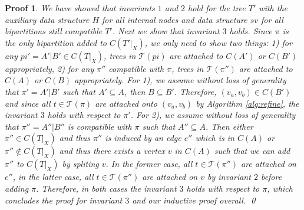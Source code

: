\documentclass{bmcart}
\theoremstyle{mystyle}
\theoremstyle{proofstyle}
\newtheorem*{proof2}{Proof}
\newenvironment{proofnospace}{\begin{proof2}}{\qed \end{proof2}}
\begin{document}
\begin{proofnospace}
    We have showed that invariants $1$ and $2$ hold for the tree $T'$ with the auxiliary data structure $H$ for all internal nodes and data structure $sv$ for all bipartitions still compatible $T'$. Next we show that invariant $3$ holds. Since $\pi$ is the only bipartition added to $C(T'|_X)$, we only need to show two things: 1) for any $pi'=A'|B' \in C(T|_X)$, trees in $\mathcal{T}(pi)$ are attached to $C(A')$ or $C(B')$ appropriately, 2) for any $\pi''$ compatible with $\pi$, trees in $\mathcal{T}(\pi'')$ are attached to $C(A)$ or $C(B)$ appropriately. For 1), we assume without loss of generality that $\pi' = A'|B'$ such that $A' \subseteq A$, then $B \subseteq B'$. Therefore, $(v_a,v_b) \in C(B')$ and since all $t \in \mathcal{T}(\pi)$ are attached onto $(v_a,v_b)$ by Algorithm \ref{alg:refine}, the invariant $3$ holds with respect to $\pi'$. For 2), we assume without loss of generality that $\pi'' = A''|B''$ is compatible with $\pi$ such that $A'' \subseteq A$. Then either $\pi'' \in C(T|_X)$ and thus $\pi''$ is induced by an edge $e''$ which is in $C(A)$ or $\pi'' \notin C(T|_X)$ and thus there exists a vertex $v$ in $C(A)$ such that we can add $\pi''$ to $C(T|_X)$ by spliting $v$. In the former case, all $t \in \mathcal{T}(\pi'')$ are attached on $e''$, in the latter case, all $t \in \mathcal{T}(\pi'')$ are attached on $v$ by invariant $2$ before adding $\pi$. Therefore, in both cases the invariant $3$ holds with respect to $\pi$, which concludes the proof for invariant $3$ and our inductive proof overall.
\end{proofnospace}
\end{document}
